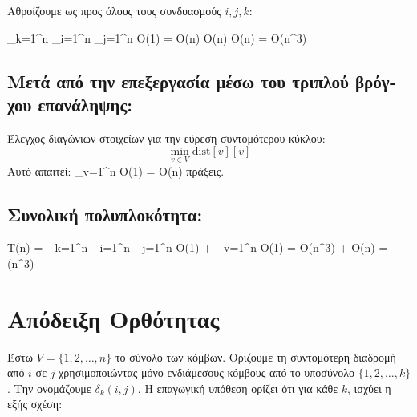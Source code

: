 \documentclass{article}
\begin{document}
\textgreek{Αθροίζουμε ως προς όλους τους συνδυασμούς \( i, j, k \):}

\sum_{k=1}^{n} \sum_{i=1}^{n} \sum_{j=1}^{n} O(1) = O(n) \cdot O(n) \cdot O(n) = O(n^3)

\subsection*{\textgreek{Μετά από την επεξεργασία μέσω του τριπλού βρόγχου επανάληψης: }}

\textgreek{\textgreek{Έλεγχος διαγώνιων στοιχείων για την εύρεση συντομότερου κύκλου: }}
\[
\min_{v \in V} \text{dist}[v][v]
\]
\textgreek{Αυτό απαιτεί: }  \sum_{v=1}^{n} O(1) = O(n)  \textgreek{ πράξεις.}

\subsection*{\textgreek{Συνολική πολυπλοκότητα: }}

T(n) = \sum_{k=1}^{n} \sum_{i=1}^{n} \sum_{j=1}^{n} O(1) + \sum_{v=1}^{n} O(1) = O(n^3) 
+ O(n) = (n^3)



\section*{\textgreek{Απόδειξη Ορθότητας}}

\textgreek{Έστω $V = \{1, 2, \dots, n\}$ το σύνολο των κόμβων. Ορίζουμε τη συντομότερη διαδρομή από $i$ σε $j$ χρησιμοποιώντας μόνο ενδιάμεσους κόμβους από το υποσύνολο $\{1, 2, \dots, k\}$. Την ονομάζουμε $\delta_k(i,j)$. Η επαγωγική υπόθεση ορίζει ότι για κάθε $k$, ισχύει η εξής σχέση:}
\end{document}
